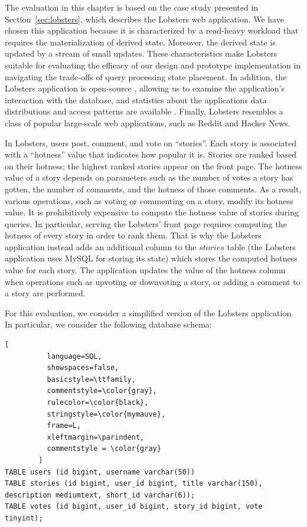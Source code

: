 The evaluation in this chapter is based on the case study presented in Section~\ref{sec:lobsters},
which describes the Lobsters \cite{lobste:rs} web application.
We have chosen this application because it is characterized by a read-heavy workload that requires the materialization
of derived state.
Moreover, the derived state is updated by a stream of small updates.
These characteristics make Lobsters suitable for evaluating the efficacy of our design and prototype implementation in
navigating the trade-offs of query processing state placement.
In addition, the Lobsters application is open-source \cite{lobsters:source},
allowing us to examine the application's interaction with the database,
and statistics about the applications data distributions and access patterns are available \cite{lobste:stats}.
Finally, Lobsters resembles a class of popular large-scale web applications, such as Reddit and Hacker News.

\bigskip
\noindent
In Lobsters, users post, comment, and vote on ``stories''.
Each story is associated with a ``hotness'' value that indicates how popular it is.
Stories are ranked based on their hotness;
the highest ranked stories appear on the front page.
The hotness value of a story depends on parameters such as the number of votes a story has gotten,
the number of comments, and the hotness of those comments.
As a result, various operations, such as voting or commenting on a story, modify its hotness value.
It is prohibitively expensive \cite{gjengset:noria} to compute the hotness value of stories during queries.
In particular, serving the Lobsters' front page requires computing the hotness of every story in order to rank them.
That is why the Lobsters application instead adds an additional column to the $stories$ table (the Lobsters application
uses MySQL for storing its state) which stores the computed hotness value for each story.
The application updates the value of the hotness column when operations such as upvoting or downvoting a story, or
adding a comment to a story are performed.

For this evaluation, we consider a simplified version of the Lobsters application.
In particular, we consider the following database schema:

\begin{lstlisting}[
          language=SQL,
          showspaces=false,
          basicstyle=\ttfamily,
          commentstyle=\color{gray},
          rulecolor=\color{black},
          stringstyle=\color{mymauve},
          frame=L,
          xleftmargin=\parindent,
          commentstyle = \color{gray}
        ]
TABLE users (id bigint, username varchar(50))
TABLE stories (id bigint, user_id bigint, title varchar(150), description mediumtext, short_id varchar(6));
TABLE votes (id bigint, user_id bigint, story_id bigint, vote tinyint);
\end{lstlisting}

